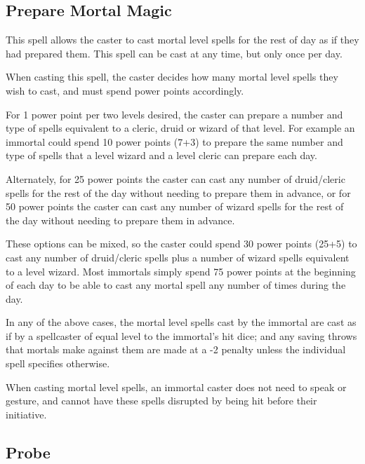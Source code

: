 \begin{multicols*}{2}
\subsection{Prepare Mortal Magic}

This spell allows the caster to cast mortal level spells for the rest of day as if they had prepared them. This spell can be cast at any time, but only once per day.

When casting this spell, the caster decides how many mortal level spells they wish to cast, and must spend power points accordingly.

For 1 power point per two levels desired, the caster can prepare a number and type of spells equivalent to a cleric, druid or wizard of that level. For example an immortal could spend 10 power points (7+3) to prepare the same number and type of spells that a  level wizard and a  level cleric can prepare each day.

Alternately, for 25 power points the caster can cast any number of druid/cleric spells for the rest of the day without needing to prepare them in advance, or for 50 power points the caster can cast any number of wizard spells for the rest of the day without needing to prepare them in advance.

These options can be mixed, so the caster could spend 30 power points (25+5) to cast any number of druid/cleric spells plus a number of wizard spells equivalent to a  level wizard. Most immortals simply spend 75 power points at the beginning of each day to be able to cast any mortal spell any number of times during the day.

In any of the above cases, the mortal level spells cast by the immortal are cast as if by a spellcaster of equal level to the immortal’s hit dice; and any saving throws that mortals make against them are made at a -2 penalty unless the individual spell specifies otherwise.

When casting mortal level spells, an immortal caster does not need to speak or gesture, and cannot have these spells disrupted by being hit before their initiative.

\subsection{Probe}
\end{multicols*}
